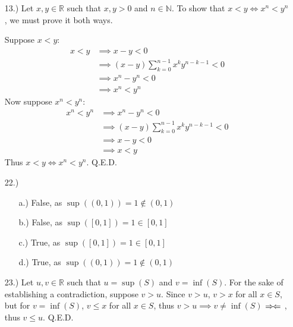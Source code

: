\documentclass[12pt]{article}
\newcommand{\contradiction}{
    \ensuremath{{\Rightarrow\mspace{-2mu}\Leftarrow}}
}
\begin{document}
\pagestyle{fancy}
\fancyhead{}

\normalsize
\begin{itemize}

    \item [13.)] Let $x,y\in\mathbb{R}$ such that $x,y>0$ and $n\in\mathbb{N}$. To show that $x<y\iff x^n<y^n$, we must prove it both ways.

    Suppose $x<y$:
    \begin{align*}
        x<y&\implies x-y<0\\
        &\implies (x-y)\sum_{k=0}^{n-1}x^ky^{n-k-1}<0\\
        &\implies x^n-y^n<0\\
        &\implies x^n<y^n
    \end{align*}
    Now suppose $x^n<y^n$:
    \begin{align*}
        x^n<y^n&\implies x^n-y^n<0\\
        &\implies(x-y)\sum_{k=0}^{n-1}x^ky^{n-k-1}<0\\
        &\implies x-y<0\\
        &\implies x<y
    \end{align*}
    Thus $x<y\iff x^n<y^n$. Q.E.D.


    \item [22.)] \begin{itemize}
        \item [a.)] False, as $\sup((0,1))=1\notin(0,1)$

        \item [b.)] False, as $\sup([0,1])=1\in[0,1]$

        \item [c.)] True, as $\sup([0,1])=1\in[0,1]$

        \item [d.)] True, as $\sup((0,1))=1\notin(0,1)$
    \end{itemize}

    \item [23.)] Let $u,v\in\mathbb{R}$ such that $u=\sup(S)$ and $v=\inf(S)$. For the sake of establishing a contradiction, suppose $v>u$. Since $v>u$, $v>x$ for all $x\in S$, but for $v=\inf(S)$, $v\leq x$ for all $x\in S$, thus $v>u\implies v\neq\inf(S)$\contradiction, thus $v\leq u$. Q.E.D.


\end{itemize}
\end{document}

